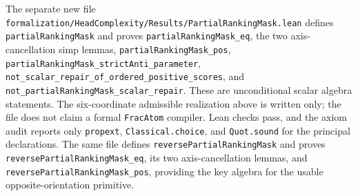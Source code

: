 \documentclass[11pt]{article}
\begin{document}
The separate new file
\texttt{formalization/HeadComplexity/Results/PartialRankingMask.lean}
defines \texttt{partialRankingMask} and proves
\texttt{partialRankingMask\_eq}, the two axis-cancellation simp lemmas,
\texttt{partialRankingMask\_pos},
\texttt{partialRankingMask\_strictAnti\_parameter},
\texttt{not\_scalar\_repair\_of\_ordered\_positive\_scores}, and
\texttt{not\_partialRankingMask\_scalar\_repair}.
These are unconditional scalar algebra statements. The six-coordinate
admissible realization above is written only; the file does not claim
a formal \texttt{FracAtom} compiler. Lean checks pass, and the axiom
audit reports only \texttt{propext}, \texttt{Classical.choice}, and
\texttt{Quot.sound} for the principal declarations.
The same file defines \texttt{reversePartialRankingMask} and proves
\texttt{reversePartialRankingMask\_eq}, its two axis-cancellation
lemmas, and \texttt{reversePartialRankingMask\_pos}, providing the
key algebra for the usable opposite-orientation primitive.
\end{document}

